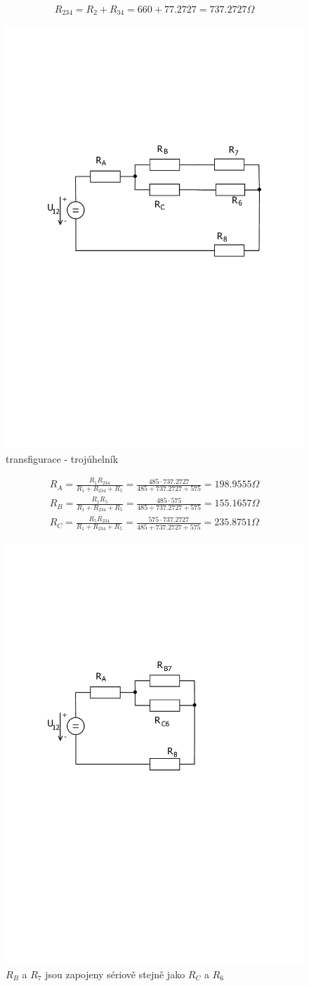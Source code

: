 	\begin{gather*}
		R_{234} = R_2 + R_{34} = 660 + 77.2727 = 737.2727 \Omega
	\end{gather*}
	\begin{figure}[H]
		\center\includegraphics[width=0.6\linewidth]{obr/1_4}
		\caption{transfigurace - trojúhelník}
	\end{figure}
	\begin{gather*}
		R_A = \frac{R_1  R_{234}}{R_1 + R_{234} + R_5} = \frac{485 \cdot 737.2727}{485 +  737.2727 + 575} = 198.9555 \Omega \\
		R_B = \frac{R_1  R_5}{R_1 + R_{234} + R_5} = \frac{485 \cdot 575}{485 +  737.2727 + 575} = 155.1657 \Omega \\
		R_C = \frac{R_5  R_{234}}{R_1 + R_{234} + R_5} = \frac{575 \cdot 737.2727}{485 +  737.2727 + 575} = 235.8751 \Omega 
	\end{gather*}
	\begin{figure}[H]
		\center\includegraphics[width=0.6\linewidth]{obr/1_5}
		\caption{$R_B$ a $R_7$ jsou zapojeny sériově stejně jako $R_C$ a $R_6$}
	\end{figure}
